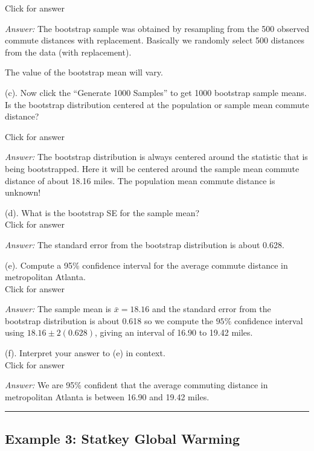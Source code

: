 \documentclass[
]{book}
\begin{document}
Click for answer

\emph{Answer:} The bootstrap sample was obtained by resampling from the 500 observed commute distances with
replacement. Basically we randomly select 500 distances from the data (with replacement).

The value of the bootstrap mean will vary.

(c). Now click the ``Generate 1000 Samples'' to get 1000 bootstrap sample means. Is the bootstrap distribution centered at the population or sample mean commute distance?

Click for answer

\emph{Answer:} The bootstrap distribution is always centered around the statistic that is being bootstrapped. Here it will be centered around the sample mean commute distance of about 18.16 miles. The population mean
commute distance is unknown!

(d). What is the bootstrap SE for the sample mean?\\

Click for answer

\emph{Answer:} The standard error from the bootstrap distribution is about 0.628.

(e). Compute a 95\% confidence interval for the average commute distance in metropolitan Atlanta.\\

Click for answer

\emph{Answer:} The sample mean is \(\bar{x} = 18.16\) and the standard error from the bootstrap distribution is about 0.618 so we compute the \(95\%\) confidence interval using \(18.16 \pm 2(0.628)\), giving an interval of 16.90 to 19.42 miles.

(f). Interpret your answer to (e) in context.\\

Click for answer

\emph{Answer:} We are 95\% confident that the average commuting distance in metropolitan Atlanta is between 16.90 and 19.42 miles.

\begin{center}\rule{0.5\linewidth}{0.5pt}\end{center}

\hypertarget{example-3-statkey-global-warming}{%
\subsection{Example 3: Statkey Global Warming}\label{example-3-statkey-global-warming}}
\end{document}
